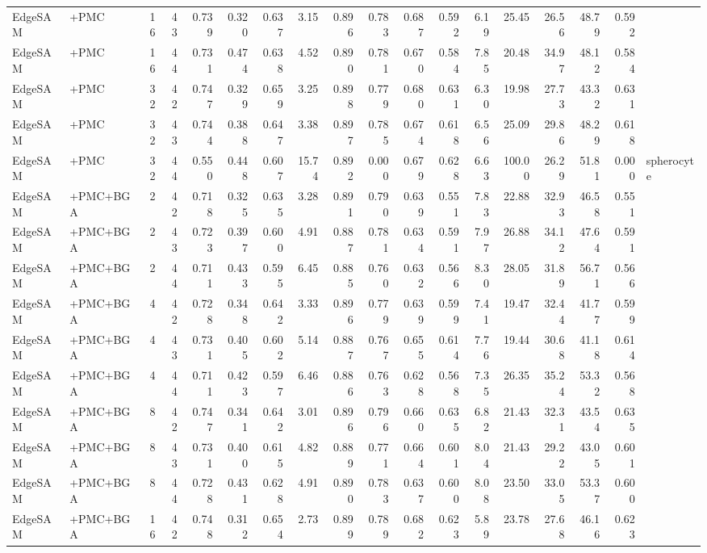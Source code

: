 \documentclass[10pt]{article}
\begin{document}
\begin{landscape}
{\begin{longtable}{l l r r r r r r r r r r r r r r r l}
EdgeSAM & +PMC & 16 & 43 & 0.739 & 0.320 & 0.637 & 3.15 & 0.896 & 0.783 & 0.687 & 0.592 & 6.19 & 25.45 & 26.56 & 48.79 & 0.592 &  \\
EdgeSAM & +PMC & 16 & 44 & 0.731 & 0.474 & 0.638 & 4.52 & 0.890 & 0.781 & 0.670 & 0.584 & 7.85 & 20.48 & 34.97 & 48.12 & 0.584 &  \\
EdgeSAM & +PMC & 32 & 42 & 0.747 & 0.329 & 0.659 & 3.25 & 0.898 & 0.779 & 0.680 & 0.631 & 6.30 & 19.98 & 27.73 & 43.32 & 0.631 &  \\
EdgeSAM & +PMC & 32 & 43 & 0.744 & 0.388 & 0.647 & 3.38 & 0.897 & 0.785 & 0.674 & 0.618 & 6.56 & 25.09 & 29.86 & 48.29 & 0.618 &  \\
EdgeSAM & +PMC & 32 & 44 & 0.550 & 0.448 & 0.607 & 15.74 & 0.892 & 0.000 & 0.679 & 0.628 & 6.63 & 100.00 & 26.29 & 51.81 & 0.000 & spherocyte \\
EdgeSAM & +PMC+BGA & 2 & 42 & 0.718 & 0.325 & 0.635 & 3.28 & 0.891 & 0.790 & 0.639 & 0.551 & 7.83 & 22.88 & 32.93 & 46.58 & 0.551 &  \\
EdgeSAM & +PMC+BGA & 2 & 43 & 0.723 & 0.397 & 0.600 & 4.91 & 0.887 & 0.781 & 0.634 & 0.591 & 7.97 & 26.88 & 34.12 & 47.64 & 0.591 &  \\
EdgeSAM & +PMC+BGA & 2 & 44 & 0.711 & 0.433 & 0.595 & 6.45 & 0.885 & 0.760 & 0.632 & 0.566 & 8.30 & 28.05 & 31.89 & 56.71 & 0.566 &  \\
EdgeSAM & +PMC+BGA & 4 & 42 & 0.728 & 0.348 & 0.642 & 3.33 & 0.896 & 0.779 & 0.639 & 0.599 & 7.41 & 19.47 & 32.44 & 41.77 & 0.599 &  \\
EdgeSAM & +PMC+BGA & 4 & 43 & 0.731 & 0.405 & 0.602 & 5.14 & 0.887 & 0.767 & 0.655 & 0.614 & 7.76 & 19.44 & 30.68 & 41.18 & 0.614 &  \\
EdgeSAM & +PMC+BGA & 4 & 44 & 0.711 & 0.423 & 0.597 & 6.46 & 0.886 & 0.763 & 0.628 & 0.568 & 7.35 & 26.35 & 35.24 & 53.32 & 0.568 &  \\
EdgeSAM & +PMC+BGA & 8 & 42 & 0.747 & 0.341 & 0.642 & 3.01 & 0.896 & 0.796 & 0.660 & 0.635 & 6.82 & 21.43 & 32.31 & 43.54 & 0.635 &  \\
EdgeSAM & +PMC+BGA & 8 & 43 & 0.731 & 0.400 & 0.615 & 4.82 & 0.889 & 0.771 & 0.664 & 0.601 & 8.04 & 21.43 & 29.22 & 43.05 & 0.601 &  \\
EdgeSAM & +PMC+BGA & 8 & 44 & 0.728 & 0.431 & 0.628 & 4.91 & 0.890 & 0.783 & 0.637 & 0.600 & 8.08 & 23.50 & 33.05 & 53.37 & 0.600 &  \\
EdgeSAM & +PMC+BGA & 16 & 42 & 0.748 & 0.312 & 0.654 & 2.73 & 0.899 & 0.789 & 0.682 & 0.623 & 5.89 & 23.78 & 27.68 & 46.16 & 0.623 &  \\

\end{longtable}}
\end{landscape}
\end{document}
